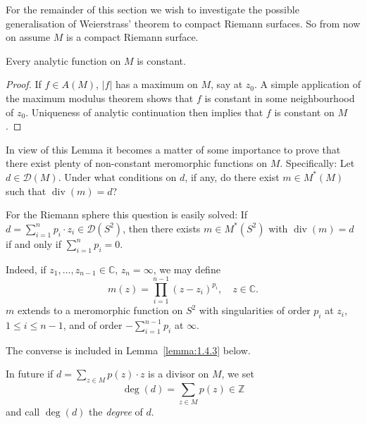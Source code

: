 For the remainder of this section we wish to investigate the possible generalisation of Weierstrass' theorem to compact Riemann surfaces. So from now on assume $M$ is a compact Riemann surface.

 Every analytic function on $M$ is constant.
\begin{proof} If $f\in A(M)$, $|f|$ has a maximum on $M$, say at $z_0$. A simple application of the maximum modulus theorem shows that $f$ is constant in some neighbourhood of $z_0$. Uniqueness of analytic continuation then implies that $f$ is constant on $M$. \end{proof}
In view of this Lemma it becomes a matter of some importance to prove that there exist plenty of non-constant meromorphic functions on $M$. Specifically: Let $d\in\mathcal D(M)$. Under what conditions on $d$, if any, do there exist $m\in M^*(M)$ such that $\operatorname{div}(m)=d$?

For the Riemann sphere this question is easily solved:
If $d=\sum_{i=1}^n p_i\cdot z_i\in\mathcal D(S^2)$, then there exists $m\in M^*(S^2)$ with $\operatorname{div}(m)=d$ if and only if $\sum_{i=1}^n p_i=0$.

Indeed, if $z_1,\ldots,z_{n-1}\in\mathbb C$, $z_n=\infty$, we may define
\[ m(z)=\prod_{i=1}^{n-1}(z-z_i)^{p_i},\quad z\in\mathbb C. \]
$m$ extends to a meromorphic function on $S^2$ with singularities of order $p_i$ at $z_i$, $1\leq i\leq n-1$, and of order $-\sum_{i=1}^{n-1}p_i$ at $\infty$.

The converse is included in Lemma~\ref{lemma:1.4.3} below.

In future if $d=\sum_{z\in M}p(z)\cdot z$ is a divisor on $M$, we set
\[ \deg(d)=\sum_{z\in M}p(z)\in\mathbb Z \]
and call $\deg(d)$ the \emph{degree} of $d$.


